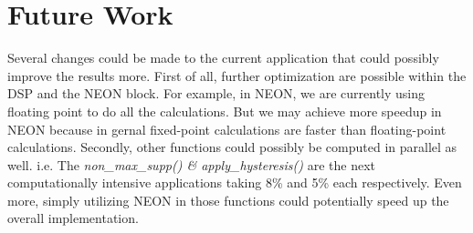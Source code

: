 \section{Future Work}
\label{sec:Future Work}
Several changes could be made to the current application that could possibly improve the results more.
First of all, further optimization are possible within the DSP and the NEON block. For example, in NEON, we are currently using floating point to do all the calculations. But we may achieve more speedup in NEON because in gernal fixed-point calculations are faster than floating-point calculations.
Secondly, other functions could possibly be computed in parallel as well.
i.e. The \textit{non\_max\_supp() \& apply\_hysteresis()} are the next computationally intensive applications taking 8\% and 5\% each respectively.
Even more, simply utilizing NEON in those functions could potentially speed up the overall implementation.